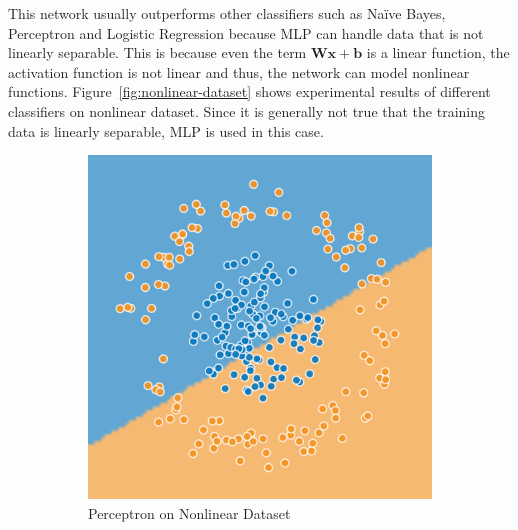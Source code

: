\documentclass[12pt]{article}
\theoremstyle{remark}
\newcommand{\mat}[1]{\mathbf{#1}}
\begin{document}
This network usually outperforms other classifiers such as Na\"ive Bayes, Perceptron and Logistic Regression because MLP can handle data that is not linearly separable. This is because even the term \(\mat W \mat x + \mat b\) is a linear function, the activation function is not linear and thus, the network can model nonlinear functions. Figure~\ref{fig:nonlinear-dataset} shows experimental results of different classifiers on nonlinear dataset. Since it is generally not true that the training data is linearly separable, MLP is used in this case.

\begin{figure}[!h]
	\centering
	\begin{subfigure}[b]{0.4\textwidth}
		\includegraphics[width=\textwidth]{perceptron-nonlinear}
		\caption{Perceptron on Nonlinear Dataset}
		\label{fig:perceptron-nonlinear}
	\end{subfigure}
	\begin{subfigure}[b]{0.4\textwidth}

\end{subfigure}
\end{figure}
\end{document}
